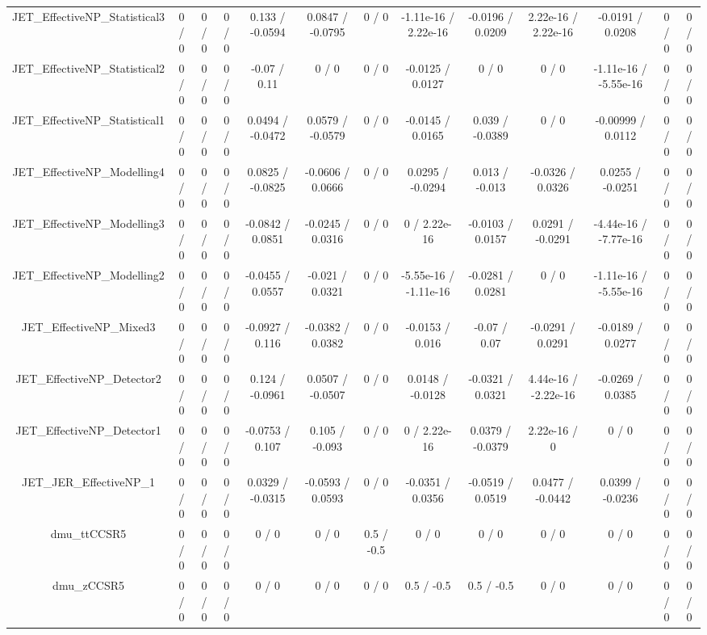 \documentclass[10pt]{article}
\begin{document}
\begin{table}[htbp]
\begin{center}
\begin{tabular}{|c|c|c|c|c|c|c|c|c|c|c|c|c|}
  JET_EffectiveNP_Statistical3 & 0 / 0 & 0 / 0 & 0 / 0 & 0.133 / -0.0594 & 0.0847 / -0.0795 & 0 / 0 & -1.11e-16 / 2.22e-16 & -0.0196 / 0.0209 & 2.22e-16 / 2.22e-16 & -0.0191 / 0.0208 & 0 / 0 & 0 / 0 \\ 
  JET_EffectiveNP_Statistical2 & 0 / 0 & 0 / 0 & 0 / 0 & -0.07 / 0.11 & 0 / 0 & 0 / 0 & -0.0125 / 0.0127 & 0 / 0 & 0 / 0 & -1.11e-16 / -5.55e-16 & 0 / 0 & 0 / 0 \\ 
  JET_EffectiveNP_Statistical1 & 0 / 0 & 0 / 0 & 0 / 0 & 0.0494 / -0.0472 & 0.0579 / -0.0579 & 0 / 0 & -0.0145 / 0.0165 & 0.039 / -0.0389 & 0 / 0 & -0.00999 / 0.0112 & 0 / 0 & 0 / 0 \\ 
  JET_EffectiveNP_Modelling4 & 0 / 0 & 0 / 0 & 0 / 0 & 0.0825 / -0.0825 & -0.0606 / 0.0666 & 0 / 0 & 0.0295 / -0.0294 & 0.013 / -0.013 & -0.0326 / 0.0326 & 0.0255 / -0.0251 & 0 / 0 & 0 / 0 \\ 
  JET_EffectiveNP_Modelling3 & 0 / 0 & 0 / 0 & 0 / 0 & -0.0842 / 0.0851 & -0.0245 / 0.0316 & 0 / 0 & 0 / 2.22e-16 & -0.0103 / 0.0157 & 0.0291 / -0.0291 & -4.44e-16 / -7.77e-16 & 0 / 0 & 0 / 0 \\ 
  JET_EffectiveNP_Modelling2 & 0 / 0 & 0 / 0 & 0 / 0 & -0.0455 / 0.0557 & -0.021 / 0.0321 & 0 / 0 & -5.55e-16 / -1.11e-16 & -0.0281 / 0.0281 & 0 / 0 & -1.11e-16 / -5.55e-16 & 0 / 0 & 0 / 0 \\ 
  JET_EffectiveNP_Mixed3 & 0 / 0 & 0 / 0 & 0 / 0 & -0.0927 / 0.116 & -0.0382 / 0.0382 & 0 / 0 & -0.0153 / 0.016 & -0.07 / 0.07 & -0.0291 / 0.0291 & -0.0189 / 0.0277 & 0 / 0 & 0 / 0 \\ 
  JET_EffectiveNP_Detector2 & 0 / 0 & 0 / 0 & 0 / 0 & 0.124 / -0.0961 & 0.0507 / -0.0507 & 0 / 0 & 0.0148 / -0.0128 & -0.0321 / 0.0321 & 4.44e-16 / -2.22e-16 & -0.0269 / 0.0385 & 0 / 0 & 0 / 0 \\ 
  JET_EffectiveNP_Detector1 & 0 / 0 & 0 / 0 & 0 / 0 & -0.0753 / 0.107 & 0.105 / -0.093 & 0 / 0 & 0 / 2.22e-16 & 0.0379 / -0.0379 & 2.22e-16 / 0 & 0 / 0 & 0 / 0 & 0 / 0 \\ 
  JET_JER_EffectiveNP_1 & 0 / 0 & 0 / 0 & 0 / 0 & 0.0329 / -0.0315 & -0.0593 / 0.0593 & 0 / 0 & -0.0351 / 0.0356 & -0.0519 / 0.0519 & 0.0477 / -0.0442 & 0.0399 / -0.0236 & 0 / 0 & 0 / 0 \\ 
  dmu_ttCCSR5 & 0 / 0 & 0 / 0 & 0 / 0 & 0 / 0 & 0 / 0 & 0.5 / -0.5 & 0 / 0 & 0 / 0 & 0 / 0 & 0 / 0 & 0 / 0 & 0 / 0 \\ 
  dmu_zCCSR5 & 0 / 0 & 0 / 0 & 0 / 0 & 0 / 0 & 0 / 0 & 0 / 0 & 0.5 / -0.5 & 0.5 / -0.5 & 0 / 0 & 0 / 0 & 0 / 0 & 0 / 0 \\ 

\end{tabular}
\end{center}
\end{table}
\end{document}
